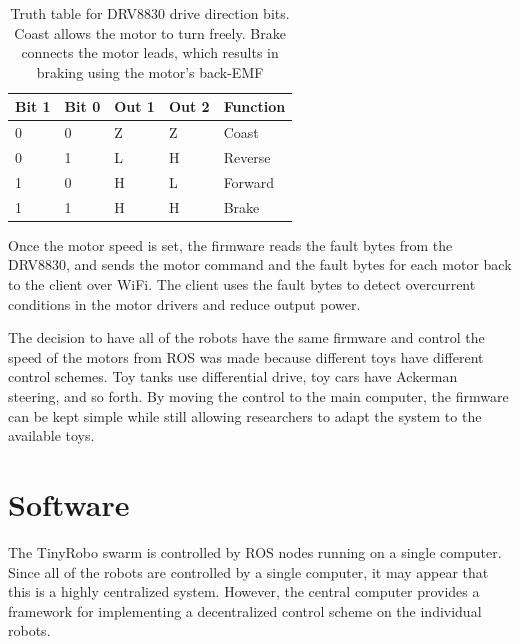 \documentclass[]{article}
\begin{document}
\begin{table}
	\begin{tabular}{l l l l l}
	Bit 1 & Bit 0 & Out 1 & Out 2 & Function\\
	\hline
	0 & 0 & Z & Z & Coast\\
	0 & 1 & L & H & Reverse\\
	1 & 0 & H & L & Forward\\
	1 & 1 & H & H & Brake\\				
	\end{tabular}
	
	\caption{Truth table for DRV8830 drive direction bits. Coast allows the motor to turn freely. Brake connects the motor leads, which results in braking using the motor's back-EMF}
	\label{tab:DRV8830_truth}
\end{table}

Once the motor speed is set, the firmware reads the fault bytes from the DRV8830, and sends the motor command and the fault bytes for each motor back to the client over WiFi. 
The client uses the fault bytes to detect overcurrent conditions in the motor drivers and reduce output power. 

The decision to have all of the robots have the same firmware and control the speed of the motors from ROS was made because different toys have different control schemes. 
Toy tanks use differential drive, toy cars have Ackerman steering, and so forth. 
By moving the control to the main computer, the firmware can be kept simple while still allowing researchers to adapt the system to the available toys. 

\section{Software}

The TinyRobo swarm is controlled by ROS nodes running on a single computer.
Since all of the robots are controlled by a single computer, it may appear that this is a highly centralized system. 
However, the central computer provides a framework for implementing a decentralized control scheme on the individual robots. 
\end{document}
